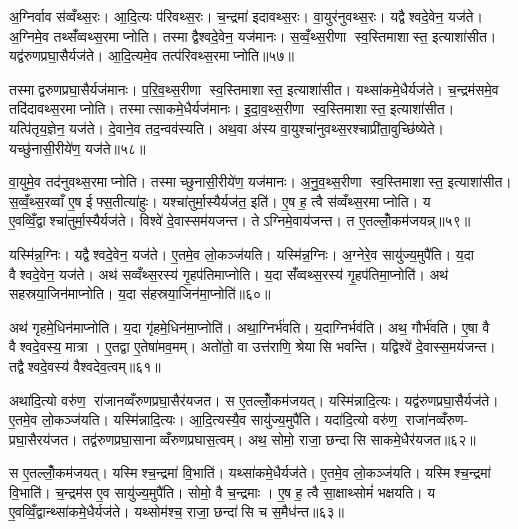 
अ॒ग्निर्वाव स॑व्वँथ्स॒रः। आ॒दि॒त्यः प॑रिवथ्स॒रः। च॒न्द्रमा॑ इदावथ्स॒रः। वा॒युर॑नुवथ्स॒रः। यद्वैश्वदे॒वेन॒ यज॑ते। अ॒ग्निमे॒व तथ्सँ॑व्वथ्स॒रमाप्नोति। तस्माद्वैश्वदे॒वेन॒ यज॑मानः। स॒व्वँ॒थ्स॒रीणा स्व॒स्तिमाशास्त॒ इत्याशा॑सीत। यद्व॑रुणप्रघा॒सैर्यज॑ते। आ॒दि॒त्यमे॒व तत्प॑रिवथ्स॒रमाप्नोति॥५७॥

तस्माद्वरुणप्रघा॒सैर्यज॑मानः। प॒रि॒व॒थ्स॒रीणा स्व॒स्तिमाशास्त॒ इत्याशा॑सीत। यथ्सा॑कमे॒धैर्यज॑ते। च॒न्द्रम॑समे॒व तदि॑दावथ्स॒रमाप्नोति। तस्मात्साकमे॒धैर्यज॑मानः। इ॒दा॒व॒थ्स॒रीणा स्व॒स्तिमाशास्त॒ इत्याशा॑सीत। यत्पि॑तृय॒ज्ञेन॒ यज॑ते। दे॒वाने॒व तद॒न्वव॑स्यति। अथ॒वा अ॑स्य वा॒युश्चा॑नुवथ्स॒रश्चाप्री॑ता॒वुच्छि॑ष्येते। यच्छु॑नासी॒रीये॑ण॒ यज॑ते॥५८॥

वा॒युमे॒व तद॑नुवथ्स॒रमाप्नोति। तस्माच्छुनासी॒रीये॑ण॒ यज॑मानः। अ॒नु॒व॒थ्स॒रीणा स्व॒स्तिमाशास्त॒ इत्याशा॑सीत। स॒व्वँ॒थ्स॒रव्वाँ ए॒ष ईफ्स॒तीत्या॑हुः। यश्चा॑तुर्मा॒स्यैर्यज॑त॒ इति॑। ए॒ष ह॒ त्वै स॑व्वँथ्स॒रमाप्नोति। य ए॒वव्विँ॒द्वाश्चा॑तुर्मा॒स्यैर्यज॑ते। विश्वे॑ दे॒वास्सम॑यजन्त। तेऽग्निमे॒वाय॑जन्त। त ए॒तल्लोँ॒कम॑जयन्न्॥५९॥

यस्मि॑न्न॒ग्निः। यद्वैश्वदे॒वेन॒ यज॑ते। ए॒तमे॒व लो॒कञ्ज॑यति। यस्मि॑न्न॒ग्निः। अ॒ग्नेरे॒व सायु॑ज्य॒मुपै॑ति। य॒दा वैश्वदे॒वेन॒ यज॑ते। अथ॑ सव्वँथ्स॒रस्य॑ गृ॒हप॑तिमाप्नोति। य॒दा सँ॑व्वथ्स॒रस्य॑ गृ॒हप॑तिमा॒प्नोति॑। अथ॑ सहस्रया॒जिन॑माप्नोति। य॒दा स॑हस्रया॒जिन॑मा॒प्नोति॑॥६०॥

अथ॑ गृहमे॒धिन॑माप्नोति। य॒दा गृ॑हमे॒धिन॑मा॒प्नोति॑। अथा॒ग्निर्भ॑वति। य॒दाग्निर्भव॑ति। अथ॒ गौर्भ॑वति। ए॒षा वै वैश्वदे॒वस्य॒ मात्रा। ए॒तद्वा ए॒तेषा॑मव॒मम्। अतो॑तो॒ वा उत्त॑राणि॒ श्रेयासि भवन्ति। यद्विश्वे॑ दे॒वास्स॒मय॑जन्त। तद्वैश्वदे॒वस्य॑ वैश्वदेव॒त्वम्॥६१॥

अथा॑दि॒त्यो वरु॑ण॒ रा॑जानव्वँरुणप्रघा॒सैर॑यजत। स ए॒तल्लोँ॒कम॑जयत्। यस्मि॑न्नादि॒त्यः। यद्व॑रुणप्रघा॒सैर्यज॑ते। ए॒तमे॒व लो॒कञ्ज॑यति। यस्मि॑न्नादि॒त्यः। आ॒दि॒त्यस्यै॒व सायु॑ज्य॒मुपै॑ति। यदा॑दि॒त्यो वरु॑ण॒ राजा॑नव्वँरुण- प्रघा॒सैरय॑जत। तद्व॑रुणप्रघा॒सानाव्वँरुणप्रघास॒त्वम्। अथ॒ सोमो॒ राजा॒ छन्दासि साकमे॒धैर॑यजत॥६२॥

स ए॒तल्लोँ॒कम॑जयत्। यस्मिश्च॒न्द्रमा॑ वि॒भाति॑। यथ्सा॑कमे॒धैर्यज॑ते। ए॒तमे॒व लो॒कञ्ज॑यति। यस्मिश्च॒न्द्रमा॑ वि॒भाति॑। च॒न्द्रम॑स ए॒व सायु॑ज्य॒मुपै॑ति। सोमो॒ वै च॒न्द्रमाः। ए॒ष ह॒ त्वै सा॒क्षाथ्सोमं॑ भक्षयति। य ए॒वव्विँ॒द्वान्थ्सा॑कमे॒धैर्यज॑ते। यथ्सोम॑श्च॒ राजा॒ छन्दा॑सि च स॒मैध॑न्त॥६३॥

